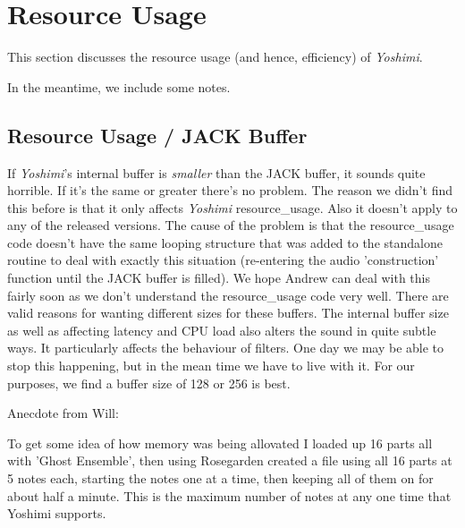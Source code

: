 %
%
%

\section{Resource Usage}
\label{sec:resource_usage}

   This section discusses the resource usage (and hence, efficiency) of
   \textsl{Yoshimi}.

   In the meantime, we include some notes.

\subsection{Resource Usage / JACK Buffer}
\label{sec:resource_usage_jack_buffer}

   If \textsl{Yoshimi}'s internal buffer is \textsl{smaller} than the JACK
   buffer, it sounds quite horrible. If it's the same or greater there's no
   problem. The reason we didn't find this before is that it only affects
   \textsl{Yoshimi} resource_usage.  Also it doesn't apply to any of the
   released versions.  The cause of the problem is that the resource_usage code
   doesn't have the same looping structure that was added to the standalone
   routine to deal with exactly this situation (re-entering the audio
   'construction' function until the JACK buffer is filled). We hope Andrew can
   deal with this fairly soon as we don't understand the resource_usage code
   very well.  There are valid reasons for wanting different sizes for these
   buffers. The internal buffer size as well as affecting latency and CPU load
   also alters the sound in quite subtle ways. It particularly affects the
   behaviour of filters.  One day we may be able to stop this happening, but in
   the mean time we have to live with it.  For our purposes, we find a buffer
   size of 128 or 256 is best.

   Anecdote from Will:

   To get some idea of how memory was being allovated I loaded up 16 parts all
   with 'Ghost Ensemble', then using Rosegarden created a file using all 16
   parts at 5 notes each, starting the notes one at a time, then keeping all of
   them on for about half a minute. This is the maximum number of notes at any
   one time that Yoshimi supports.

